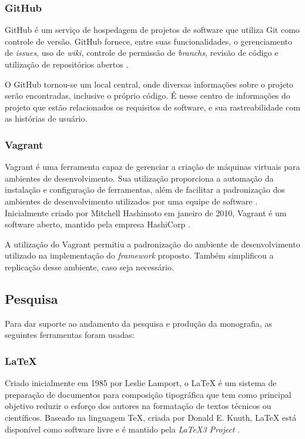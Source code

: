 \begin{apendicesenv}
\subsubsection{GitHub}
GitHub é um serviço de hospedagem de projetos de software que utiliza Git como controle de versão. GitHub fornece, entre suas funcionalidades, o gerenciamento de \textit{issues}, uso de \textit{wiki}, controle de permissão de \textit{branchs}, revisão de código e utilização de repositórios abertos \cite{gitlab}.
\par
\indent O GitHub tornou-se um local central, onde diversas informações sobre o projeto serão encontradas, inclusive o próprio código. É nesse centro de informações do projeto que estão relacionados os requisitos de software, e sua rastreabilidade com as histórias de usuário.

\subsubsection{Vagrant}
Vagrant é uma ferramenta capaz de gerenciar a criação de máquinas virtuais para ambientes de desenvolvimento. Sua utilização proporciona a automação da instalação e configuração de ferramentas, além de facilitar a padronização dos ambientes de desenvolvimento utilizados por uma equipe de software \cite{vagrant2015}. Inicialmente criado por Mitchell Hashimoto em janeiro de 2010, Vagrant é um software aberto, mantido pela empresa HashiCorp \cite{vagrant2015}. 

A utilização do Vagrant permitiu a padronização do ambiente de desenvolvimento utilizado na implementação do \textit{framework} proposto. Também simplificou a replicação desse ambiente, caso seja necessário.

\subsection{Pesquisa}
Para dar suporte ao andamento da pesquisa e produção da monografia, as seguintes ferramentas foram usadas:

\subsubsection{LaTeX}
Criado inicialmente em 1985 por Leslie Lamport, o LaTeX é um sistema de preparação de documentos para composição tipográfica que tem como principal objetivo reduzir o esforço dos autores na formatação de textos técnicos ou científicos. Baseado na linguagem TeX, criada por Donald E. Knuth, LaTeX está disponível como software livre e é mantido pela \textit{LaTeX3 Project} \cite{latex2015}.


\end{apendicesenv}
